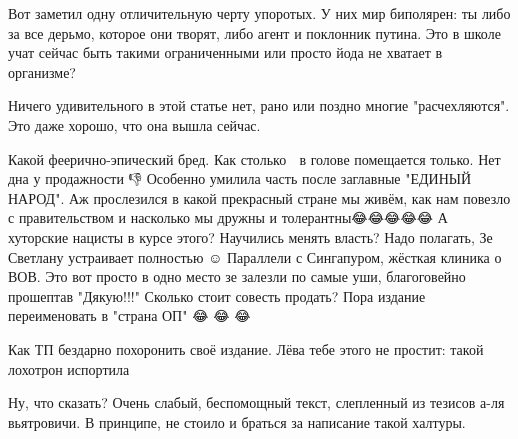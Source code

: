 \begin{itemize}
Вот заметил одну отличительную черту упоротых. У них мир биполярен: ты либо за
все дерьмо, которое они творят, либо агент и поклонник путина. Это в школе учат
сейчас быть такими ограниченными или просто йода не хватает в организме?

 

Ничего удивительного в этой статье нет, рано или поздно многие "расчехляются".
Это даже хорошо, что она вышла сейчас.


 

Какой феерично-эпический бред. Как столько 💩 в голове помещается только. Нет
дна у продажности 👎 Особенно умилила часть после заглавные "ЕДИНЫЙ НАРОД". Аж
прослезился в какой прекрасный стране мы живём, как нам повезло с
правительством и насколько мы дружны и толерантны😂😂😂😂😂 А хуторские нацисты
в курсе этого? Научились менять власть? Надо полагать, Зе Светлану устраивает
полностью ☺️ Параллели с Сингапуром, жёсткая клиника о ВОВ. Это вот просто в
одно место зе залезли по самые уши, благоговейно прошептав "Дякую!!!" Сколько
стоит совесть продать? Пора издание переименовать в "страна ОП" 😂 😂 😂

 
Как ТП бездарно похоронить своё издание. Лёва тебе этого не простит: такой лохотрон испортила

 

Ну, что сказать? Очень слабый, беспомощный текст, слепленный из тезисов а-ля
вьятровичи. В принципе, не стоило и браться за написание такой халтуры.


\end{itemize}
